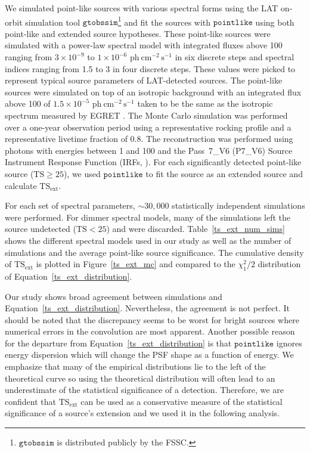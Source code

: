 \documentclass[12pt,preprint]{aastex}
\newcommand{\mev}{\text{MeV}\xspace}
\newcommand{\gev}{\text{GeV}\xspace}
\newcommand{\phflux}{\ensuremath{\text{ph}\ \text{cm}^{-2}\,\text{s}^{-1}}\xspace}
\newcommand{\tsext}{{\ensuremath{\text{TS}_{\text{ext}}}}\xspace}
\newcommand{\ts}{\text{TS}\xspace}
\newcommand{\pointlike}{\ensuremath{\mathtt{pointlike}}\xspace}
\newcommand{\gtobssim}{\ensuremath{\mathtt{gtobssim}}\xspace}
\begin{document}
We simulated point-like sources with various spectral forms using
the LAT on-orbit simulation tool
\gtobssim\footnote{\gtobssim is distributed publicly by the FSSC.} and fit the sources
with \pointlike using both point-like
and extended source hypotheses.  These point-like sources were simulated with a power-law
spectral model with integrated fluxes above 100 \mev ranging from $3\times10^{-9}$ 
to $1\times10^{-6}$ \phflux in six discrete steps and spectral
indices ranging from 1.5 to 3 in four discrete steps.  These values
were picked to represent typical source parameters of LAT-detected
sources. The point-like sources were simulated on top of an isotropic
background with an integrated flux above 100 \mev of $1.5\times10^{-5}$ \phflux
taken to be the same as the isotropic spectrum measured by EGRET
\citep{sreekumar_isotropic}.  The Monte Carlo simulation was performed
over a one-year observation period using a representative rocking profile and a
representative livetime fraction of 0.8.  The reconstruction was performed
using photons with energies between 1 \gev and 100 \gev 
and the Pass~7\_V6 (P7\_V6) Source Instrument
Response Function (IRFs, \cite{lat_on_orbit_psf}).  For each 
significantly detected point-like source ($\ts\ge25$), we used \pointlike
to fit the source as an extended source and calculate \tsext.


For each set of spectral parameters, $\sim30,000$ statistically independent
simulations were performed. For dimmer spectral models, many of the
simulations left the source undetected ($\ts<25$)
and were discarded.  Table~\ref{ts_ext_num_sims}
shows the different spectral models used in our study as well as the
number of simulations and the average point-like source
significance.  The cumulative density of \tsext is plotted in
Figure~\ref{ts_ext_mc} and compared to the $\chi^2_1/2$ distribution of
Equation~\ref{ts_ext_distribution}.

Our study shows broad agreement between simulations and
Equation~\ref{ts_ext_distribution}. Nevertheless, the agreement is not
perfect.  It should be noted that the discrepancy seems to be worst for
bright sources where numerical errors in the convolution
are most apparent.  Another possible
reason for the departure from Equation~\ref{ts_ext_distribution} 
is that \pointlike ignores energy dispersion which will change the
PSF shape as a function of energy. We emphasize that many of
the empirical distributions lie to the left of the theoretical curve so
using the theoretical distribution will often lead to an underestimate of the
statistical significance of a detection. Therefore, we are confident that
\tsext can be used as a conservative measure of the statistical
significance of a source's extension and we used it in the following analysis.
\end{document}
